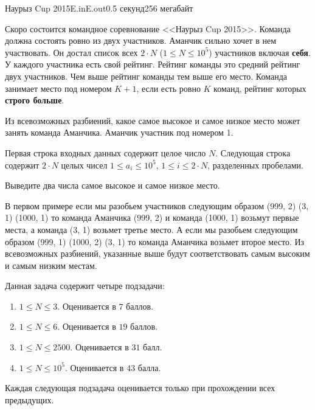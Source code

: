\begin{problem}{Наурыз Cup 2015}{E.in}{E.out}{0.5 секунд}{256 мегабайт}

Скоро состоится командное соревнование <<Наурыз Cup 2015>>. Команда должна состоять ровно из двух участников. Аманчик сильно хочет в нем участвовать. Он достал список всех $2 \cdot N$ ($1 \le N \le 10^5$) участников включая \textbf{себя}. У каждого участника есть свой рейтинг. Рейтинг команды это средний рейтинг двух участников. Чем выше рейтинг команды тем выше его место. Команда занимает место под номером $K+1$, если есть ровно $K$ команд, рейтинг которых \textbf{строго больше}. 

Из всевозможных разбиений, какое самое высокое и самое низкое место может занять команда Аманчика. Аманчик участник под номером 1. 

\InputFile
Первая строка входных данных содержит целое число $N$. Следующая строка содержит $2 \cdot N$ целых чисел $1 \le a_i \le 10^5$, $1 \le i \le 2 \cdot N$, разделенных пробелами. 

\OutputFile
Выведите два числа самое высокое и самое низкое место.

\Examples

\begin{example}
%
%
%
\end{example}


В первом примере если мы разобьем участников следующим образом (999, 2) (3, 1) (1000, 1) то команда Аманчика (999, 2) и команда (1000, 1) возьмут первые места, а команда (3, 1) возьмет третье место. А если мы разобьем следующим образом (999, 1) (1000, 2) (3, 1) то команда Аманчика возьмет второе место. Из всевозможных разбиений, указанные выше будут соответствовать самым высоким и самым низким местам.    

\Scoring
Данная задача содержит четыре подзадачи:
\begin{enumerate}
\item $1 \le N \le 3$. Оценивается в $7$ баллов.
\item $1 \le N \le 6$. Оценивается в $19$ баллов.
\item $1 \le N \le 2500$. Оценивается в $31$ балл.
\item $1 \le N \le 10^5$. Оценивается в $43$ балла.
\end{enumerate}

Каждая следующая подзадача оценивается только при прохождении всех предыдущих.

\end{problem}
